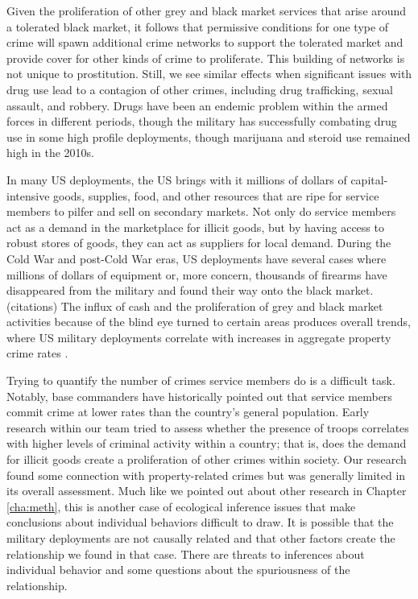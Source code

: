 Given the proliferation of other grey and black market services that arise around a tolerated black market, it follows that permissive conditions for one type of crime will spawn additional crime networks to support the tolerated market and provide cover for other kinds of crime to proliferate. This building of networks is not unique to prostitution. Still, we see similar effects when significant issues with drug use lead to a contagion of other crimes, including drug trafficking, sexual assault, and robbery. Drugs have been an endemic problem within the armed forces in different periods, though the military has successfully combating drug use in some high profile deployments, though marijuana and steroid use remained high in the 2010s.\cite{Nelson1987,ballweg1991,Baker2004,bucher2012} 

In many US deployments, the US brings with it millions of dollars of capital-intensive goods, supplies, food, and other resources that are ripe for service members to pilfer and sell on secondary markets.\cite{Bryant1979,Nelson1987} Not only do service members act as a demand in the marketplace for illicit goods, but by having access to robust stores of goods, they can act as suppliers for local demand. During the Cold War and post-Cold War eras, US deployments have several cases where millions of dollars of equipment or, more concern, thousands of firearms have disappeared from the military and found their way onto the black market. (citations) The influx of cash and the proliferation of grey and black market activities because of the blind eye turned to certain areas produces overall trends, where US military deployments correlate with increases in aggregate property crime rates \cite{allenandflynn2013}.


Trying to quantify the number of crimes service members do is a difficult task. Notably, base commanders have historically pointed out that service members commit crime at lower rates than the country's general population.\cite{Gillem2007} Early research within our team tried to assess whether the presence of troops correlates with higher levels of criminal activity within a country; that is, does the demand for illicit goods create a proliferation of other crimes within society. Our research found some connection with property-related crimes but was generally limited in its overall assessment.\cite{allenandflynn2013} Much like we pointed out about other research in Chapter \ref{cha:meth}, this is another case of ecological inference issues that make conclusions about individual behaviors difficult to draw. It is possible that the military deployments are not causally related and that other factors create the relationship we found in that case. There are threats to inferences about individual behavior and some questions about the spuriousness of the relationship.\cite{King2004} 

